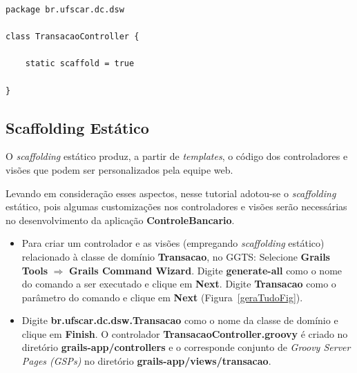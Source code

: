 \begin{lstlisting}[caption=Controlador {\bf TransacaoController (1)}, frame =
    trBL, float=htbp, label=codTransacaoController] 
package br.ufscar.dc.dsw

class TransacaoController {
    
    static scaffold = true

}
\end{lstlisting}

\subsection{Scaffolding Estático}\label{secEstatico} 

\vspace{0.5cm}

O {\it scaffolding}  estático produz, a partir de {\it  templates}, o código dos
controladores e visões que podem ser personalizados pela equipe web.  

Levando  em  consideração  esses  aspectos,  nesse  tutorial  adotou-se  o  {\it
  scaffolding} estático,  pois algumas customizações nos  controladores e visões
serão necessárias no desenvolvimento da aplicação {\bf ControleBancario}.

\begin{itemize}

\vspace{0.2cm}

\item  Para criar  um  controlador  e as  visões  (empregando {\it  scaffolding}
  estático) relacionado à classe de  domínio {\bf Transacao}, no GGTS: Selecione
  {\bf Grails Tools} $\Longrightarrow$ {\bf Grails Command Wizard}.  Digite {\bf
    generate-all}  como o  nome do  comando  a ser  executado e  clique em  {\bf
    Next}. Digite {\bf  Transacao} como o parâmetro do comando  e clique em {\bf
    Next} (Figura~\ref{geraTudoFig}).  

\vspace{0.2cm}

\item Digite {\bf br.ufscar.dc.dsw.Transacao} como o nome da classe
  de    domínio   e   clique    em   {\bf    Finish}.    O    controlador   {\bf
    TransacaoController.groovy}      é     criado     no      diretório     {\bf
    grails-app/controllers} e o corresponde conjunto de {\em Groovy Server Pages
    (GSPs)} no diretório {\bf grails-app/views/transacao}.

\end{itemize}

